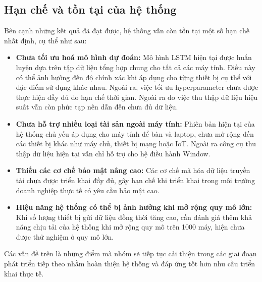 \subsection{Hạn chế và tồn tại của hệ thống}

\noindent Bên cạnh những kết quả đã đạt được, hệ thống vẫn còn tồn tại một số hạn chế nhất định, cụ thể như sau:

\begin{itemize}[label=--]
    \item \textbf{Chưa tối ưu hoá mô hình dự đoán:} Mô hình LSTM hiện tại được huấn luyện dựa trên tập dữ liệu tổng hợp chung cho tất cả các máy tính. Điều này có thể ảnh hưởng đến độ chính xác khi áp dụng cho từng thiết bị cụ thể với đặc điểm sử dụng khác nhau. Ngoài ra, việc tối ưu hyperparameter chưa được thực hiện đầy đủ do hạn chế thời gian. Ngoài ra do việc thu thập dữ liệu hiệu suất vẫn còn phức tạp nên dẫn đến chưa đủ dữ liệu.
    \item \textbf{Chưa hỗ trợ nhiều loại tài sản ngoài máy tính:} Phiên bản hiện tại của hệ thống chủ yếu áp dụng cho máy tính để bàn và laptop, chưa mở rộng đến các thiết bị khác như máy chủ, thiết bị mạng hoặc IoT. Ngoài ra công cụ thu thập dữ liệu hiện tại vẫn chỉ hỗ trợ cho hệ điều hành Window.
    \item \textbf{Thiếu các cơ chế bảo mật nâng cao:} Các cơ chế mã hóa dữ liệu truyền tải chưa được triển khai đầy đủ, gây hạn chế khi triển khai trong môi trường doanh nghiệp thực tế có yêu cầu bảo mật cao.
    \item \textbf{Hiệu năng hệ thống có thể bị ảnh hưởng khi mở rộng quy mô lớn:} Khi số lượng thiết bị gửi dữ liệu đồng thời tăng cao, cần đánh giá thêm khả năng chịu tải của hệ thống khi mở rộng quy mô trên 1000 máy, hiện chưa được thử nghiệm ở quy mô lớn.
\end{itemize}
\noindent Các vấn đề trên là những điểm mà nhóm sẽ tiếp tục cải thiện trong các giai đoạn phát triển tiếp theo nhằm hoàn thiện hệ thống và đáp ứng tốt hơn nhu cầu triển khai thực tế.

